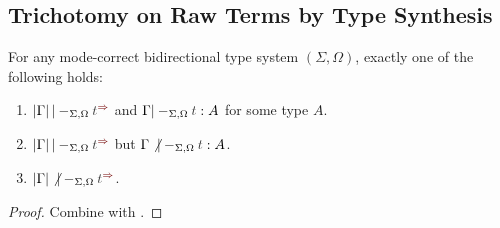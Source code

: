 \subsection{Trichotomy on Raw Terms by Type Synthesis} \label{subsec:trichotomy}


\begin{corollary}\label{cor:trichotomy}
  For any mode-correct bidirectional type system $(\Sigma, \Omega)$, 
  exactly one of the following holds:
  \begin{enumerate}
    \item $\erase{\Gamma} |-_{\Sigma, \Omega} \isTerm{t}^{\syn}$ and\/ $\Gamma |-_{\Sigma, \Omega} \isTerm{t} : A$ for some type $A$.
    \item $\erase{\Gamma} |-_{\Sigma, \Omega} \isTerm{t}^{\syn}$ but\/ $\Gamma \not|-_{\Sigma, \Omega} \isTerm{t} : A$.
    \item $\erase{\Gamma} \not|-_{\Sigma, \Omega} \isTerm{t}^{\syn}$.
  \end{enumerate}
\end{corollary}
\begin{proof}
  Combine  with .
  
\end{proof}
